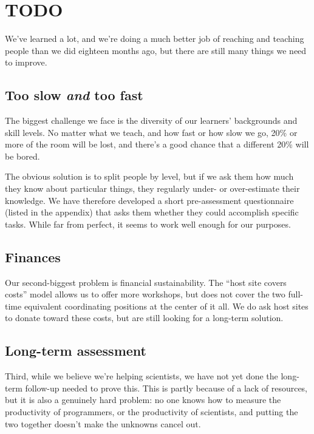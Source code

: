\documentclass[10pt,a4paper,twocolumn]{article}
\begin{document}
\section*{TODO}

We've learned a lot, and we're doing a much better job of reaching and
teaching people than we did eighteen months ago, but there are still
many things we need to improve.

\subsection*{Too slow \emph{and} too fast}

The biggest challenge we face is the diversity of our learners'
backgrounds and skill levels. No matter what we teach, and how fast or
how slow we go, 20\% or more of the room will be lost, and there's a
good chance that a different 20\% will be bored.

The obvious solution is to split people by level, but if we ask them
how much they know about particular things, they regularly under- or
over-estimate their knowledge.  We have therefore developed a short
pre-assessment questionnaire (listed in the appendix) that asks them
whether they could accomplish specific tasks.  While far from perfect,
it seems to work well enough for our purposes.

\subsection*{Finances}

Our second-biggest problem is financial sustainability. The ``host
site covers costs'' model allows us to offer more workshops, but does
not cover the two full-time equivalent coordinating positions at the
center of it all.  We do ask host sites to donate toward these costs,
but are still looking for a long-term solution.

\subsection*{Long-term assessment}

Third, while we believe we're helping scientists, we have not yet done
the long-term follow-up needed to prove this. This is partly because of
a lack of resources, but it is also a genuinely hard problem: no one
knows how to measure the productivity of programmers, or the
productivity of scientists, and putting the two together doesn't make
the unknowns cancel out.
\end{document}
